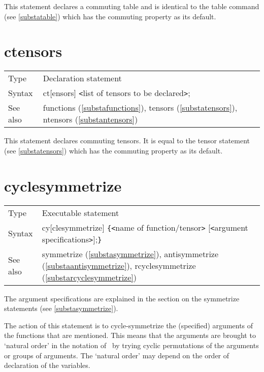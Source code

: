 \noindent This statement declares a commuting 
table and is identical to the table command (see 
\ref{substatable}) which has the commuting property as its default. 
\vspace{10mm}

 
\section{ctensors}
\label{substactensors}

\noindent \begin{tabular}{ll}
Type & Declaration statement\\
Syntax & ct[ensors] {\tt<}list of tensors to be declared{\tt>}; \\
See also & functions (\ref{substafunctions}), tensors 
        (\ref{substatensors}), ntensors (\ref{substantensors})
\end{tabular} \vspace{4mm}

\noindent This statement declares commuting 
tensors. It is equal to the tensor statement (see 
\ref{substatensors}) which has the commuting property as its default. 
\vspace{10mm}


\section{cyclesymmetrize}
\label{substacyclesymmetrize}

\noindent \begin{tabular}{ll}
Type & Executable statement\\
Syntax & cy[clesymmetrize] \verb:{:{\tt<}name of function/tensor{\tt>}
         [{\tt<}argument specifications{\tt>}];\verb:}: \\
See also & symmetrize (\ref{substasymmetrize}), antisymmetrize 
(\ref{substaantisymmetrize}), rcyclesymmetrize (\ref{substarcyclesymmetrize})
\end{tabular} \vspace{4mm}

\noindent The argument specifications are explained 
in the section on the symmetrize statements (see \ref{substasymmetrize}). 
\medskip

\noindent The action of this statement is to cycle-symmetrize the (specified) 
arguments of the functions that are mentioned. This means that the 
arguments are brought to `natural order' in the notation of \FORM\ by trying 
cyclic permutations of the arguments or groups of arguments. The `natural 
order' may depend on the order of declaration of the variables. 
\vspace{10mm}

